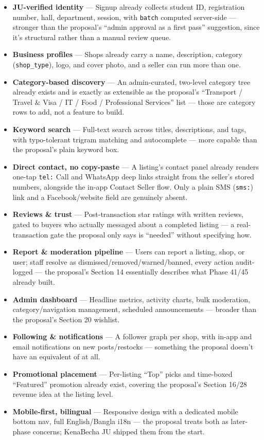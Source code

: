 \documentclass[11pt]{article}
\newcommand{\feature}[2]{%
  \item \textbf{#1} --- #2
}
\begin{document}
\begin{itemize}
  \feature{JU-verified identity}{Signup already collects student ID, registration number, hall, department, session, with \texttt{batch} computed server-side --- stronger than the proposal's ``admin approval as a first pass'' suggestion, since it's structural rather than a manual review queue.}
  \feature{Business profiles}{Shops already carry a name, description, category (\texttt{shop\_type}), logo, and cover photo, and a seller can run more than one.}
  \feature{Category-based discovery}{An admin-curated, two-level category tree already exists and is exactly as extensible as the proposal's ``Transport / Travel \& Visa / IT / Food / Professional Services'' list --- those are category rows to add, not a feature to build.}
  \feature{Keyword search}{Full-text search across titles, descriptions, and tags, with typo-tolerant trigram matching and autocomplete --- more capable than the proposal's plain keyword box.}
  \feature{Direct contact, no copy-paste}{A listing's contact panel already renders one-tap \texttt{tel:} Call and WhatsApp deep links straight from the seller's stored numbers, alongside the in-app Contact Seller flow. Only a plain SMS (\texttt{sms:}) link and a Facebook/website field are genuinely absent.}
  \feature{Reviews \& trust}{Post-transaction star ratings with written reviews, gated to buyers who actually messaged about a completed listing --- a real-transaction gate the proposal only says is ``needed'' without specifying how.}
  \feature{Report \& moderation pipeline}{Users can report a listing, shop, or user; staff resolve as dismissed/removed/warned/banned, every action audit-logged --- the proposal's Section 14 essentially describes what Phase 41/45 already built.}
  \feature{Admin dashboard}{Headline metrics, activity charts, bulk moderation, category/navigation management, scheduled announcements --- broader than the proposal's Section 20 wishlist.}
  \feature{Following \& notifications}{A follower graph per shop, with in-app and email notifications on new posts/restocks --- something the proposal doesn't have an equivalent of at all.}
  \feature{Promotional placement}{Per-listing ``Top'' picks and time-boxed ``Featured'' promotion already exist, covering the proposal's Section 16/28 revenue idea at the listing level.}
  \feature{Mobile-first, bilingual}{Responsive design with a dedicated mobile bottom nav, full English/Bangla i18n --- the proposal treats both as later-phase concerns; KenaBecha JU shipped them from the start.}
\end{itemize}
\end{document}

